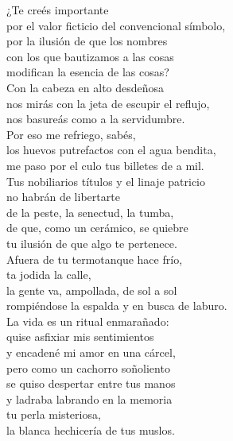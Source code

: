 

¿Te creés importante\\
por el valor ficticio del convencional símbolo,\\
por la ilusión de que los nombres\\
con los que bautizamos a las cosas\\
modifican la esencia de las cosas?\\
Con la cabeza en alto desdeñosa\\
nos mirás con la jeta de escupir el reflujo,\\
nos basureás como a la servidumbre.\\
Por eso me refriego, sabés,\\
los huevos putrefactos con el agua bendita,\\
me paso por el culo tus billetes de a mil.\\
Tus nobiliarios títulos y el linaje patricio\\
no habrán de libertarte\\
de la peste, la senectud, la tumba,\\
de que, como un cerámico, se quiebre\\
tu ilusión de que algo te pertenece.\\
Afuera de tu termotanque hace frío,\\
ta jodida la calle,\\
la gente va, ampollada, de sol a sol\\
rompiéndose la espalda y en busca de laburo.\\
La vida es un ritual enmarañado:\\
quise asfixiar mis sentimientos\\
y encadené mi amor en una cárcel,\\
pero como un cachorro soñoliento\\
se quiso despertar entre tus manos\\
y ladraba labrando en la memoria\\
tu perla misteriosa,\\
la blanca hechicería de tus muslos.\\

